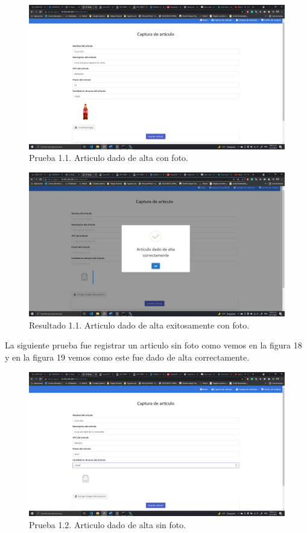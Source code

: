 \documentclass[11pt]{article}
\begin{document}
		\begin{figure}[H]
			\centering
			\includegraphics[scale=0.34]{resources/P1.png}
			\caption{Prueba 1.1. Articulo dado de alta con foto.}\label{fig:picture}
		\end{figure}
		\begin{figure}[H]
			\centering
			\includegraphics[scale=0.34]{resources/P1.1.png}
			\caption{Resultado 1.1. Articulo dado de alta exitosamente con foto.}\label{fig:picture}
		\end{figure}
		La siguiente prueba fue registrar un articulo sin foto como vemos en la figura 18 y en la figura 19 vemos como este fue dado de alta correctamente.
		\begin{figure}[H]
			\centering
			\includegraphics[scale=0.34]{resources/P1NF.png}
			\caption{Prueba 1.2. Articulo dado de alta sin foto.}\label{fig:picture}
		\end{figure}
\end{document}
